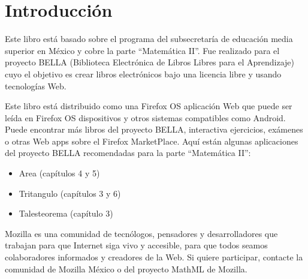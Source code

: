 \section*{Introducción}

Este libro está basado sobre el programa del subsecretaría de educación media
superior en México y cobre la parte ``Matemática II''.
Fue realizado para el proyecto BELLA
(Biblioteca Electrónica de Libros Libres para el Aprendizaje) cuyo el objetivo
es crear libros electrónicos bajo una licencia libre y usando
tecnologías Web.

Este libro está distribuido como una Firefox OS aplicación Web que puede ser leída en Firefox OS dispositivos y otros sistemas compatibles como Android.
Puede encontrar más libros del proyecto BELLA, interactiva
ejercicios, exámenes o otras Web apps sobre el Firefox MarketPlace. Aquí están
algunas aplicaciones del proyecto BELLA recomendadas para la parte
``Matemática II'':

\begin{itemize}
\item Area (capítulos 4 y 5)
\item Tritangulo (capítulos 3 y 6)
\item Talesteorema (capítulo 3)
\end{itemize}

Mozilla es una comunidad de tecnólogos, pensadores y desarrolladores que
trabajan para que Internet siga vivo y accesible, para que todos seamos
colaboradores informados y creadores de la Web. Si quiere participar, contacte
la comunidad de Mozilla México o del proyecto MathML de Mozilla.
